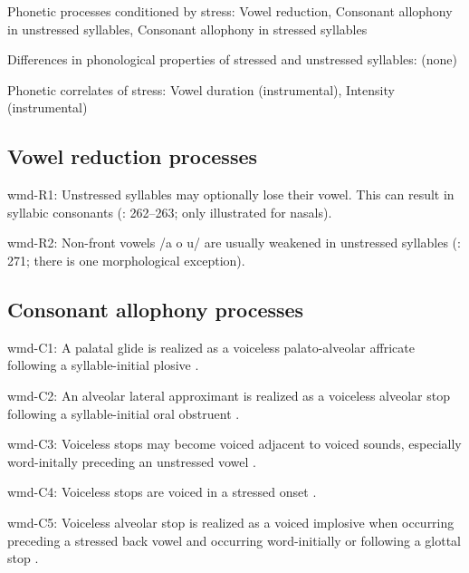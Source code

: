 {\begin{appendixdesc}
\item[Phonetic processes conditioned by stress:] Vowel reduction, Consonant allophony in unstressed syllables, Consonant allophony in stressed syllables

\item[Differences in phonological properties of stressed and unstressed syllables:] (none)

\item[Phonetic correlates of stress:] Vowel duration (instrumental), Intensity (instrumental)
\end{appendixdesc}
\subsection*{Vowel reduction processes}
\begin{appendixdesc}

\item[wmd-R1:] Unstressed syllables may optionally lose their vowel. This can result in syllabic consonants (\citealt{Eberhard2009}: 262--263; only illustrated for nasals).

\item[wmd-R2:] Non-front vowels /a o u/ are usually weakened in unstressed syllables (\citealt{Eberhard2009}: 271; there is one morphological exception).
\end{appendixdesc}
\subsection*{Consonant allophony processes}
\begin{appendixdesc}

\item[wmd-C1:] A palatal glide is realized as a voiceless palato-alveolar affricate following a syllable-initial plosive \citep[94]{Eberhard2009}.

\item[wmd-C2:] An alveolar lateral approximant is realized as a voiceless alveolar stop following a syllable-initial oral obstruent \citep[92]{Eberhard2009}.

\item[wmd-C3:] Voiceless stops may become voiced adjacent to voiced sounds, especially word-initally preceding an unstressed vowel \citep{Eberhard2009}.

\item[wmd-C4:] Voiceless stops are voiced in a stressed onset \citep[55]{Eberhard2009}.

\item[wmd-C5:] Voiceless alveolar stop is realized as a voiced implosive when occurring preceding a stressed back vowel and occurring word-initially or following a glottal stop \citep[58]{Eberhard2009}.


\end{appendixdesc}}
